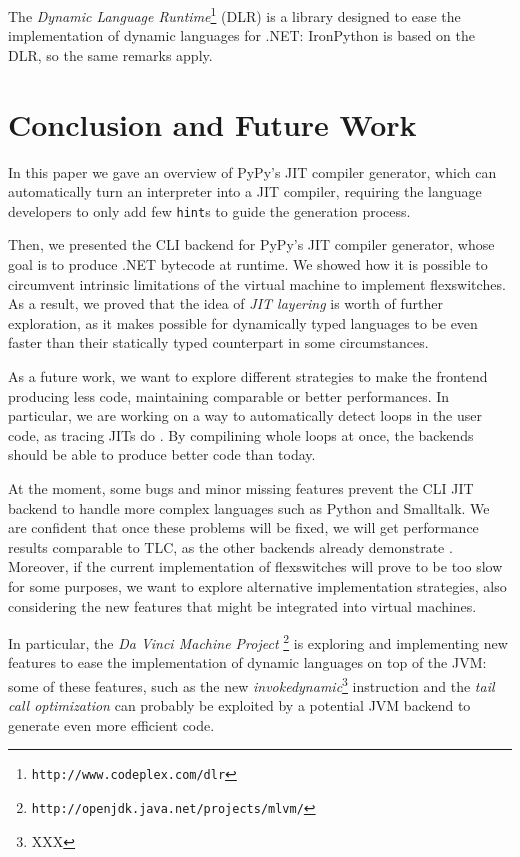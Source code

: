 The \emph{Dynamic Language Runtime}\footnote{\texttt{http://www.codeplex.com/dlr}}
(DLR) is a library designed to ease the implementation of dynamic languages
for .NET: IronPython is based on the DLR, so the same remarks apply.


\section{Conclusion and Future Work}

In this paper we gave an overview of PyPy's JIT compiler generator,
which can automatically turn an interpreter into a JIT
compiler, requiring the language developers to only add few \texttt{hint}s to
guide the generation process.

Then, we presented the CLI backend for PyPy's JIT compiler generator, whose
goal is to produce .NET bytecode at runtime.  We showed how it is possible to
circumvent intrinsic limitations of the virtual machine to implement
flexswitches.  As a result, we proved that the idea of \emph{JIT layering} is
worth of further exploration, as it makes possible for dynamically typed
languages to be even faster than their statically typed counterpart in some
circumstances.

As a future work, we want to explore different strategies to make the frontend
producing less code, maintaining comparable or better performances.  In
particular, we are working on a way to automatically detect loops in the user
code, as tracing JITs do \cite{gal_hotpathvm_2006}.  By compilining whole
loops at once, the backends should be able to produce better code than today.

At the moment, some bugs and minor missing features prevent the CLI JIT
backend to handle more complex languages such as Python and Smalltalk.  We are
confident that once these problems will be fixed, we will get performance
results comparable to TLC, as the other backends already demonstrate
\cite{PyPyJIT}.  Moreover, if the current implementation of flexswitches will
prove to be too slow for some purposes, we want to explore alternative
implementation strategies, also considering the new features that might be
integrated into virtual machines.

In particular, the \emph{Da Vinci Machine
  Project} \footnote{\texttt{http://openjdk.java.net/projects/mlvm/}} is exploring and
implementing new features to ease the implementation of dynamic languages on
top of the JVM: some of these features, such as the new
\emph{invokedynamic}\footnote{XXX} instruction and the \emph{tail call
  optimization} can probably be exploited by a potential JVM backend to
generate even more efficient code.
